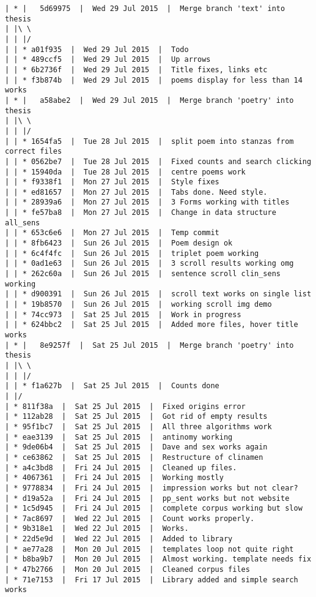 \begin{verbatim}
| * |   5d69975  |  Wed 29 Jul 2015  |  Merge branch 'text' into thesis
| |\ \  
| | |/  
| | * a01f935  |  Wed 29 Jul 2015  |  Todo
| | * 489ccf5  |  Wed 29 Jul 2015  |  Up arrows
| | * 6b2736f  |  Wed 29 Jul 2015  |  Title fixes, links etc
| | * f3b874b  |  Wed 29 Jul 2015  |  poems display for less than 14 works
| * |   a58abe2  |  Wed 29 Jul 2015  |  Merge branch 'poetry' into thesis
| |\ \  
| | |/  
| | * 1654fa5  |  Tue 28 Jul 2015  |  split poem into stanzas from correct files
| | * 0562be7  |  Tue 28 Jul 2015  |  Fixed counts and search clicking
| | * 15940da  |  Tue 28 Jul 2015  |  centre poems work
| | * f9338f1  |  Mon 27 Jul 2015  |  Style fixes
| | * ed81657  |  Mon 27 Jul 2015  |  Tabs done. Need style.
| | * 28939a6  |  Mon 27 Jul 2015  |  3 Forms working with titles
| | * fe57ba8  |  Mon 27 Jul 2015  |  Change in data structure all_sens
| | * 653c6e6  |  Mon 27 Jul 2015  |  Temp commit
| | * 8fb6423  |  Sun 26 Jul 2015  |  Poem design ok
| | * 6c4f4fc  |  Sun 26 Jul 2015  |  triplet poem working
| | * 0ad1e63  |  Sun 26 Jul 2015  |  3 scroll results working omg
| | * 262c60a  |  Sun 26 Jul 2015  |  sentence scroll clin_sens working
| | * d900391  |  Sun 26 Jul 2015  |  scroll text works on single list
| | * 19b8570  |  Sun 26 Jul 2015  |  working scroll img demo
| | * 74cc973  |  Sat 25 Jul 2015  |  Work in progress
| | * 624bbc2  |  Sat 25 Jul 2015  |  Added more files, hover title works
| * |   8e9257f  |  Sat 25 Jul 2015  |  Merge branch 'poetry' into thesis
| |\ \  
| | |/  
| | * f1a627b  |  Sat 25 Jul 2015  |  Counts done
| |/  
| * 811f38a  |  Sat 25 Jul 2015  |  Fixed origins error
| * 112ab28  |  Sat 25 Jul 2015  |  Got rid of empty results
| * 95f1bc7  |  Sat 25 Jul 2015  |  All three algorithms work
| * eae3139  |  Sat 25 Jul 2015  |  antinomy working
| * 9de06b4  |  Sat 25 Jul 2015  |  Dave and sex works again
| * ce63862  |  Sat 25 Jul 2015  |  Restructure of clinamen
| * a4c3bd8  |  Fri 24 Jul 2015  |  Cleaned up files.
| * 4067361  |  Fri 24 Jul 2015  |  Working mostly
| * 9778834  |  Fri 24 Jul 2015  |  impression works but not clear?
| * d19a52a  |  Fri 24 Jul 2015  |  pp_sent works but not website
| * 1c5d945  |  Fri 24 Jul 2015  |  complete corpus working but slow
| * 7ac8697  |  Wed 22 Jul 2015  |  Count works properly.
| * 9b318e1  |  Wed 22 Jul 2015  |  Works.
| * 22d5e9d  |  Wed 22 Jul 2015  |  Added to library
| * ae77a28  |  Mon 20 Jul 2015  |  templates loop not quite right
| * b8ba9b7  |  Mon 20 Jul 2015  |  Almost working. template needs fix
| * 47b2766  |  Mon 20 Jul 2015  |  Cleaned corpus files
| * 71e7153  |  Fri 17 Jul 2015  |  Library added and simple search works

\end{verbatim}
